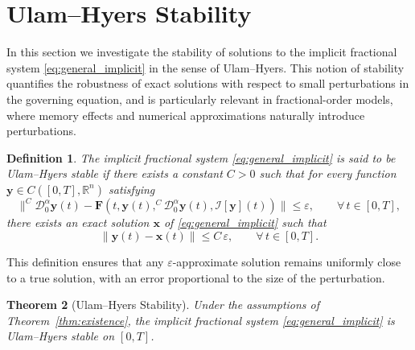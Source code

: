 \documentclass[12pt,a4paper]{article}
\newtheorem{theorem}{Theorem}[section]
\newtheorem{definition}[theorem]{Definition}
\numberwithin{equation}{section}
\begin{document}
	\section{Ulam--Hyers Stability}
	\label{sec:stability}
	
	In this section we investigate the stability of solutions to the implicit fractional system \eqref{eq:general_implicit} in the sense of Ulam--Hyers. This notion of stability quantifies the robustness of exact solutions with respect to small perturbations in the governing equation, and is particularly relevant in fractional-order models, where memory effects and numerical approximations naturally introduce perturbations.
	
	\begin{definition}
		The implicit fractional system \eqref{eq:general_implicit} is said to be \emph{Ulam--Hyers stable} if there exists a constant $C>0$ such that for every function $\mathbf{y}\in C([0,T],\mathbb{R}^n)$ satisfying
		\begin{equation}
			\Big\| ^{C}\mathcal{D}_{0}^{\alpha}\mathbf{y}(t) - \mathbf{F}\!\left( t,\mathbf{y}(t), ^{C}\mathcal{D}_{0}^{\alpha}\mathbf{y}(t), \mathcal{I}[\mathbf{y}](t) \right) \Big\| \le \varepsilon, \qquad \forall\, t\in[0,T],
			\label{eq:ulam_condition}
		\end{equation}
		there exists an exact solution $\mathbf{x}$ of \eqref{eq:general_implicit} such that
		\begin{equation}
			\|\mathbf{y}(t)-\mathbf{x}(t)\| \le C\,\varepsilon, \qquad \forall\, t\in[0,T].
			\label{eq:ulam_result}
		\end{equation}
	\end{definition}
	
	This definition ensures that any $\varepsilon$-approximate solution remains uniformly close to a true solution, with an error proportional to the size of the perturbation.
	
	\begin{theorem}[Ulam--Hyers Stability]
		\label{thm:ulam_hyers}
		Under the assumptions of Theorem~\ref{thm:existence}, the implicit fractional system \eqref{eq:general_implicit} is Ulam--Hyers stable on $[0,T]$.
	\end{theorem}
	
\end{document}
